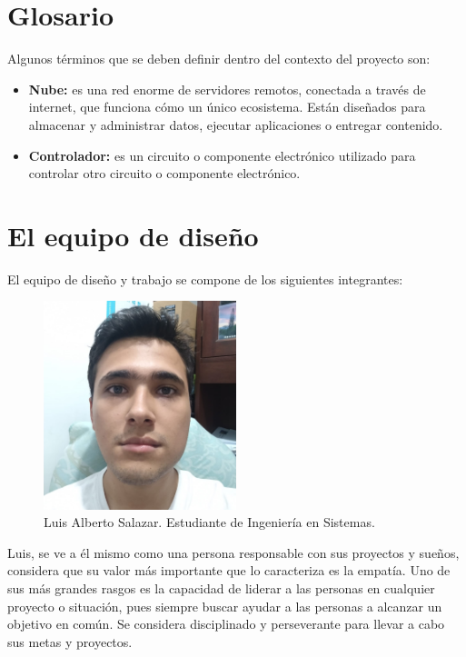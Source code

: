 \section{Glosario}

Algunos términos que se deben definir dentro del contexto del proyecto son:

\begin{itemize}
    \item \textbf{Nube:} es una red enorme de servidores remotos, conectada a través de internet, que funciona cómo un único ecosistema. Están diseñados para almacenar y administrar datos, ejecutar aplicaciones o entregar contenido.
    \item \textbf{Controlador:} es un circuito o componente electrónico utilizado para controlar otro circuito o componente electrónico.
\end{itemize}

\section{El equipo de diseño}

El equipo de diseño y trabajo se compone de los siguientes integrantes:

\begin{figure}[h]
    \centering
    \includegraphics[width=0.50\textwidth]{images/Luis.jpeg}
    \caption{Luis Alberto Salazar. Estudiante de Ingeniería en Sistemas.}
    \label{Luis}
\end{figure}

Luis, se ve a él mismo como una persona responsable con sus proyectos y sueños, considera que su valor más importante que lo caracteriza es la empatía. Uno de sus más grandes rasgos es la capacidad de liderar a las personas en cualquier proyecto o situación, pues siempre buscar ayudar a las personas a alcanzar un objetivo en común. Se considera disciplinado y perseverante para llevar a cabo sus metas y proyectos.

